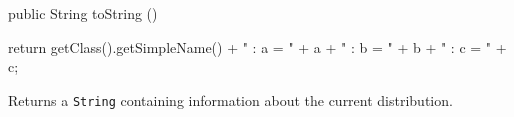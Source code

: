 \begin{hide}\begin{code}

   public String toString ()\begin{hide} {
      return getClass().getSimpleName() + " : a = " + a + " : b = " + b + " : c = " + c;
   }\end{hide}
\end{code}
\begin{tabb}
   Returns a \texttt{String} containing information about the current distribution.
\end{tabb}
\begin{htmlonly}
\end{htmlonly}\end{hide}
\begin{code}\begin{hide}
}\end{hide}
\end{code}
